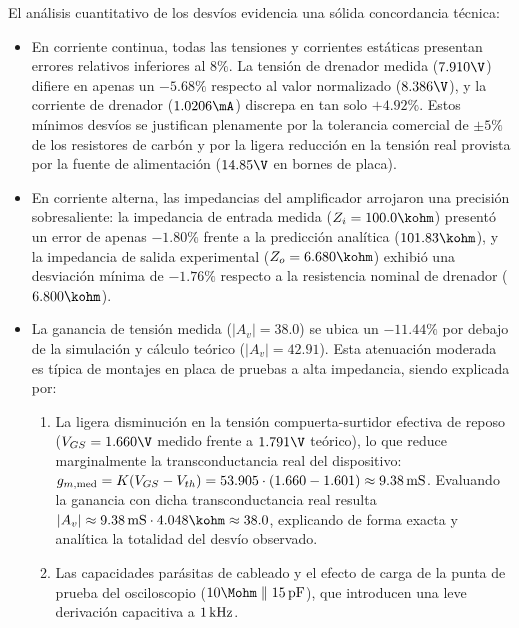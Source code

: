 El análisis cuantitativo de los desvíos evidencia una sólida concordancia técnica:
\begin{itemize}
  \item En corriente continua, todas las tensiones y corrientes estáticas presentan errores relativos inferiores al
    $8\%$. La tensión de drenador medida ($7.910\V$) difiere en apenas un $-5.68\%$ respecto al valor normalizado ($8.386\V$),
    y la corriente de drenador ($1.0206\mA$) discrepa en tan solo $+4.92\%$. Estos mínimos desvíos se justifican
    plenamente por la tolerancia comercial de $\pm 5\%$ de los resistores de carbón y por la ligera reducción en la
    tensión real provista por la fuente de alimentación ($14.85\V$ en bornes de placa).
  \item En corriente alterna, las impedancias del amplificador arrojaron una precisión sobresaliente: la impedancia de
    entrada medida ($Z_i = 100.0\kohm$) presentó un error de apenas $-1.80\%$ frente a la predicción analítica ($101.83\kohm$),
    y la impedancia de salida experimental ($Z_o = 6.680\kohm$) exhibió una desviación mínima de $-1.76\%$ respecto a la
    resistencia nominal de drenador ($6.800\kohm$).
  \item La ganancia de tensión medida ($|A_v| = 38.0$) se ubica un $-11.44\%$ por debajo de la simulación y cálculo
    teórico ($|A_v| = 42.91$). Esta atenuación moderada es típica de montajes en placa de pruebas a alta impedancia,
    siendo explicada por:
    \begin{enumerate}
      \item La ligera disminución en la tensión compuerta-surtidor efectiva de reposo ($V_{GS} = 1.660\V$ medido frente
        a $1.791\V$ teórico), lo que reduce marginalmente la transconductancia real del dispositivo:
        $g_{m,\mathrm{med}} = K(V_{GS} - V_{th}) = 53.905 \cdot (1.660 - 1.601) \approx 9.38\,\mathrm{mS}$. Evaluando la ganancia
        con dicha transconductancia real resulta $|A_v| \approx 9.38\mS \cdot 4.048\kohm \approx 38.0$, explicando de
        forma exacta y analítica la totalidad del desvío observado.
      \item Las capacidades parásitas de cableado y el efecto de carga de la punta de prueba del osciloscopio
        ($10\Mohm \parallel 15\pF$), que introducen una leve derivación capacitiva a $1\,\mathrm{kHz}$.
    \end{enumerate}
\end{itemize}
